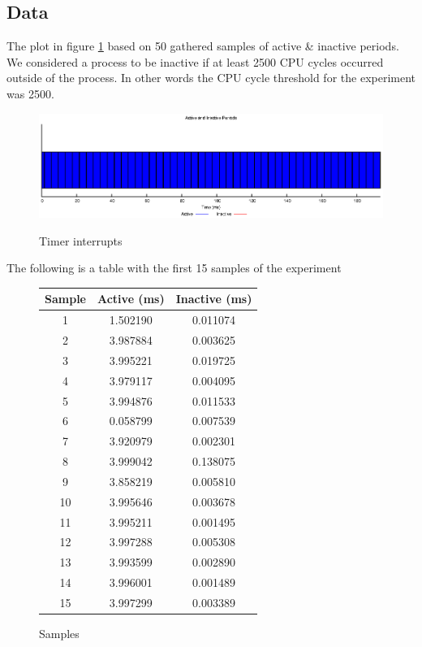 \documentclass[oneside]{amsart}
\theoremstyle{definition}
\theoremstyle{remark}
\numberwithin{equation}{section}
\begin{document}
\subsection{Data}
The plot in figure \ref{fig:plot} based on 50 gathered samples of active \& inactive periods. We
considered a process to be inactive if at least 2500 CPU cycles occurred outside of the process. In
other words the CPU cycle threshold for the experiment was 2500.

\begin{figure}[h]
    \caption{Timer interrupts}
    \centering
    \includegraphics[scale=1]{A1P1.eps}
    \label{fig:plot}
\end{figure}

\newpage

The following is a table with the first 15 samples of the experiment

\begin{figure}[h]
    \caption{Samples}
    \begin{tabular}{c|c|c}
        \rowcolor{gray!50}
        Sample & Active (ms) & Inactive (ms) \\
        \hline
        1  & 1.502190 & 0.011074 \\
        2  & 3.987884 & 0.003625 \\
        3  & 3.995221 & 0.019725 \\
        4  & 3.979117 & 0.004095 \\
        5  & 3.994876 & 0.011533 \\
        6  & 0.058799 & 0.007539 \\
        7  & 3.920979 & 0.002301 \\
        8  & 3.999042 & 0.138075 \\
        9  & 3.858219 & 0.005810 \\
        10 & 3.995646 & 0.003678 \\
        11 & 3.995211 & 0.001495 \\
        12 & 3.997288 & 0.005308 \\
        13 & 3.993599 & 0.002890 \\
        14 & 3.996001 & 0.001489 \\
        15 & 3.997299 & 0.003389
    \end{tabular}
    \label{fig:samples}
\end{figure}
\end{document}
